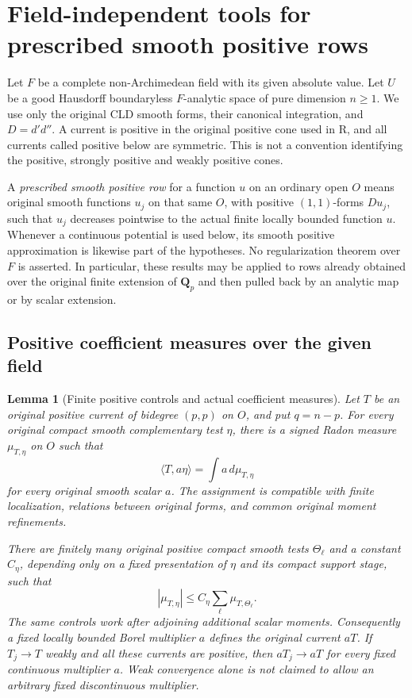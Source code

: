 \documentclass[11pt,a4paper]{article}
\numberwithin{equation}{section}
\newtheorem{lemma}[theorem]{Lemma}
\theoremstyle{definition}
\theoremstyle{remark}
\begin{document}
\section{Field-independent tools for prescribed smooth positive rows}
\label{sec:r5-prescribed-rows-package}

Let $F$ be a complete non-Archimedean field with its given absolute
value.  Let $U$ be a good Hausdorff boundaryless $F$-analytic space of
pure dimension $n\geq1$.  We use only the original CLD smooth forms,
their canonical integration, and $D=d'd''$.  A current is positive
in the original positive cone used in R, and all currents called
positive below are symmetric.  This is not a convention identifying
the positive, strongly positive and weakly positive cones.

A \emph{prescribed smooth positive row} for a function $u$ on an
ordinary open $O$ means original smooth functions $u_j$ on that
same $O$, with positive $(1,1)$-forms $Du_j$, such that $u_j$
decreases pointwise to the actual finite locally bounded function
$u$.  Whenever a continuous potential is used below, its smooth
positive approximation is likewise part of the hypotheses.  No
regularization theorem over $F$ is asserted.  In particular, these
results may be applied to rows already obtained over the original
finite extension of $\mathbf Q_p$ and then pulled back by an
analytic map or by scalar extension.

\subsection{Positive coefficient measures over the given field}

\begin{lemma}[Finite positive controls and actual coefficient measures]
\label{lem:r5-field-independent-radon}
\label{lem:r5-prescribed-coefficient-control}
Let $T$ be an original positive current of bidegree $(p,p)$ on $O$,
and put $q=n-p$.  For every original compact smooth complementary
test $\eta$, there is a signed Radon measure $\mu_{T,\eta}$ on $O$
such that
\[
 \langle T,a\eta\rangle=\int a\,d\mu_{T,\eta}
\]
for every original smooth scalar $a$.  The assignment is compatible
with finite localization, relations between original forms, and
common original moment refinements.

There are finitely many original positive compact smooth tests
$\Theta_\ell$ and a constant $C_\eta$, depending only on a fixed
presentation of $\eta$ and its compact support stage, such that
\[
 |\mu_{T,\eta}|\leq
 C_\eta\sum_\ell\mu_{T,\Theta_\ell}.
 \tag{R}
\]
The same controls work after adjoining additional scalar moments.
Consequently a fixed locally bounded Borel multiplier $a$ defines
the original current $aT$.  If $T_j\to T$ weakly and all these
currents are positive, then $aT_j\to aT$ for every fixed continuous
multiplier $a$.  Weak convergence alone is not claimed to allow
an arbitrary fixed discontinuous multiplier.
\end{lemma}
\end{document}
